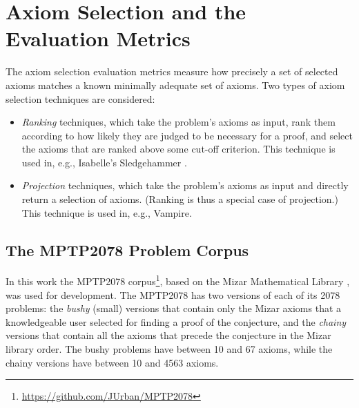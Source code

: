 \documentclass[EPiC]{easychair}
\begin{document}
\section{Axiom Selection and the Evaluation Metrics}
\label{Metrics}

The axiom selection evaluation metrics measure how precisely a set of
selected axioms matches a known minimally adequate set of axioms.
Two types of axiom selection techniques are considered:
\begin{itemize}
\item \emph{Ranking} techniques, which take the problem's axioms as input, 
      rank them according to how likely they are judged to be necessary for 
      a proof, and select the axioms that are ranked above some cut-off
      criterion.
      This technique is used in, e.g., Isabelle's Sledgehammer \cite{PB10}.
\item \emph{Projection} techniques, which take the problem's axioms as input 
      and directly return a selection of axioms.
      (Ranking is thus a special case of projection.)
      This technique is used in, e.g., Vampire.
\end{itemize}

\subsection{The MPTP2078 Problem Corpus}
\label{MPTP2078}

In this work the MPTP2078 corpus\footnote{%
\url{https://github.com/JUrban/MPTP2078}}, based on the Mizar Mathematical
Library \cite{Rud92}, was used for development.
The MPTP2078 has two versions of each of its 2078 problems: 
the \emph{bushy} (small) versions that contain only the Mizar axioms that a
knowledgeable user selected for finding a proof of the conjecture, and 
the \emph{chainy} versions that contain all the axioms that precede the 
conjecture in the Mizar library order.
The bushy problems have between 10 and 67 axioms, while the chainy versions
have between 10 and 4563 axioms.
\end{document}
